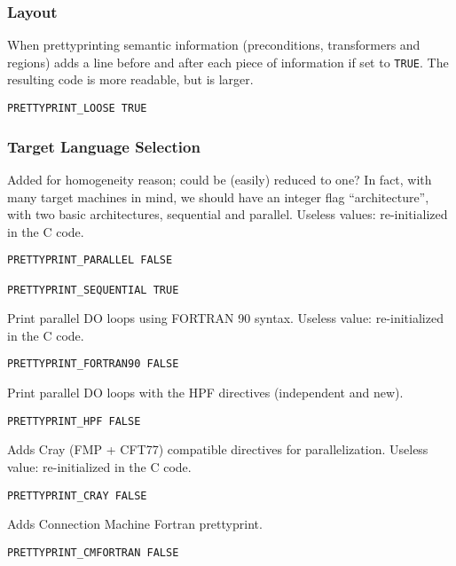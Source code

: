 \subsubsection{Layout}

When prettyprinting semantic information (preconditions, transformers and
regions) adds a line before and after each piece of information if set to
\verb+TRUE+. The resulting code is more readable, but is larger.  

\begin{verbatim}
PRETTYPRINT_LOOSE TRUE 
\end{verbatim}

\subsubsection{Target Language Selection}

Added for homogeneity reason; could be (easily) reduced to one?  In
fact, with many target machines in mind, we should have an integer flag
``architecture'', with two basic architectures, sequential and parallel.
Useless values: re-initialized in the C code.

\begin{verbatim}
PRETTYPRINT_PARALLEL FALSE

PRETTYPRINT_SEQUENTIAL TRUE
\end{verbatim}

Print parallel DO loops using FORTRAN 90 syntax. Useless value:
re-initialized in the C code.

\begin{verbatim}
PRETTYPRINT_FORTRAN90 FALSE
\end{verbatim}

Print parallel DO loops with the HPF directives (independent and new).
\begin{verbatim}
PRETTYPRINT_HPF FALSE
\end{verbatim}

Adds Cray (FMP + CFT77) compatible directives for parallelization.
Useless value: re-initialized in the C code.

\begin{verbatim}
PRETTYPRINT_CRAY FALSE
\end{verbatim}

Adds Connection Machine Fortran prettyprint.

\begin{verbatim}
PRETTYPRINT_CMFORTRAN FALSE
\end{verbatim}

